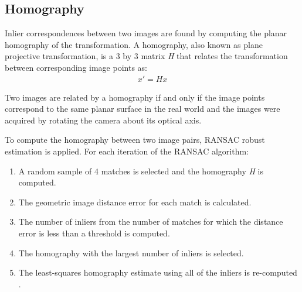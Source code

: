 \documentclass{l4proj}
\begin{document}
\subsection{Homography}

Inlier correspondences between two images are found by computing the planar homography of the transformation. A homography, also known as plane projective transformation, is a 3 by 3 matrix \textit{H} that relates the transformation between corresponding image points as:
\begin{align}
x'=Hx 
\end{align}

Two images are related by a homography if and only if the image points correspond to the same planar surface in the real world and the images were acquired by rotating the camera about its optical axis. 

To compute the homography between two image pairs, RANSAC robust estimation is applied. For each iteration of the RANSAC algorithm:

\begin{enumerate}
    \item A random sample of 4 matches is selected and the homography \textit{H} is computed.
    \item The geometric image distance error for each match is calculated.
    \item The number of inliers from the number of matches for which the distance error is less than a threshold is computed.
    \item The homography with the largest number of inliers is selected.
    \item The least-squares homography estimate using all of the inliers is re-computed \citep{Torr2000}.
    
\end{enumerate}

\end{document}
